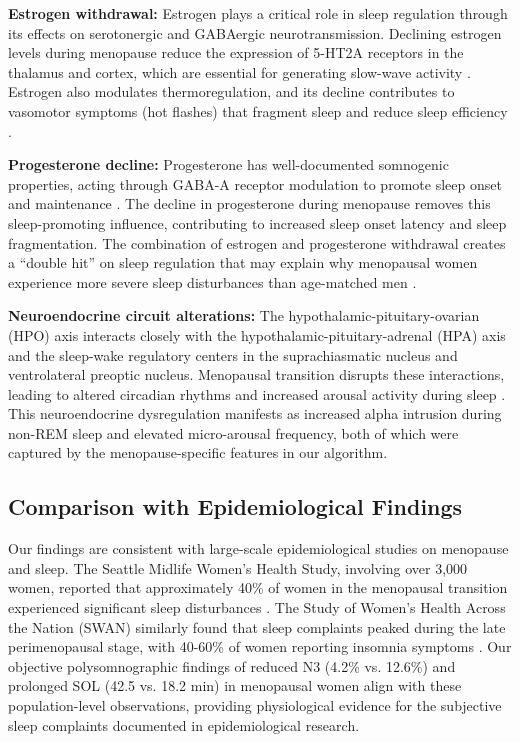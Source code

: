 \documentclass[ASNA,twocolumn]{USG}
\begin{document}
\textbf{Estrogen withdrawal:} Estrogen plays a critical role in sleep regulation through its effects on serotonergic and GABAergic neurotransmission. Declining estrogen levels during menopause reduce the expression of 5-HT2A receptors in the thalamus and cortex, which are essential for generating slow-wave activity \cite{PoloKantola1998}. Estrogen also modulates thermoregulation, and its decline contributes to vasomotor symptoms (hot flashes) that fragment sleep and reduce sleep efficiency \cite{Kronenberg1990, Freedman2004}.

\textbf{Progesterone decline:} Progesterone has well-documented somnogenic properties, acting through GABA-A receptor modulation to promote sleep onset and maintenance \cite{Manber2003}. The decline in progesterone during menopause removes this sleep-promoting influence, contributing to increased sleep onset latency and sleep fragmentation. The combination of estrogen and progesterone withdrawal creates a ``double hit'' on sleep regulation that may explain why menopausal women experience more severe sleep disturbances than age-matched men \cite{Baker2023}.

\textbf{Neuroendocrine circuit alterations:} The hypothalamic-pituitary-ovarian (HPO) axis interacts closely with the hypothalamic-pituitary-adrenal (HPA) axis and the sleep-wake regulatory centers in the suprachiasmatic nucleus and ventrolateral preoptic nucleus. Menopausal transition disrupts these interactions, leading to altered circadian rhythms and increased arousal activity during sleep \cite{deZambotti2023}. This neuroendocrine dysregulation manifests as increased alpha intrusion during non-REM sleep and elevated micro-arousal frequency, both of which were captured by the menopause-specific features in our algorithm.

\subsection{Comparison with Epidemiological Findings}

Our findings are consistent with large-scale epidemiological studies on menopause and sleep. The Seattle Midlife Women's Health Study, involving over 3,000 women, reported that approximately 40\% of women in the menopausal transition experienced significant sleep disturbances \cite{Woods2010}. The Study of Women's Health Across the Nation (SWAN) similarly found that sleep complaints peaked during the late perimenopausal stage, with 40-60\% of women reporting insomnia symptoms \cite{Kravitz2003}. Our objective polysomnographic findings of reduced N3 (4.2\% vs. 12.6\%) and prolonged SOL (42.5 vs. 18.2 min) in menopausal women align with these population-level observations, providing physiological evidence for the subjective sleep complaints documented in epidemiological research.
\end{document}
